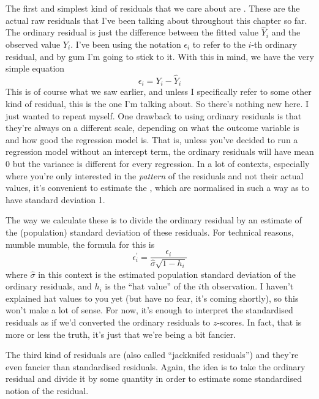The first and simplest kind of residuals that we care about are . These are the actual raw residuals that I've been talking about throughout this chapter so far. The ordinary residual is just the difference between the fitted value $\hat{Y}_i$ and the observed value $Y_i$. I've been using the notation $\epsilon_i$ to refer to the $i$-th ordinary residual, and by gum I'm going to stick to it. With this in mind, we have the very simple equation
$$
\epsilon_i = Y_i - \hat{Y}_i
$$
This is of course what we saw earlier, and unless I specifically refer to some other kind of residual, this is the one I'm talking about. So there's nothing new here. I just wanted to repeat myself. One drawback to using ordinary residuals is that they're always on a different scale, depending on what the outcome variable is and how good the regression model is. That is, unless you've decided to run a regression model without an intercept term, the ordinary residuals will have mean 0 but the variance is different for every regression. In a lot of contexts, especially where you're only interested in the {\it pattern} of the residuals and not their actual values, it's convenient to estimate the , which are normalised in such a way as to have standard deviation 1. 

\vspace{0.5cm}
\begin{mdframed}[style=MyFrame,nobreak=false]
The way we calculate these is to divide the ordinary residual by an estimate of the (population) standard deviation of these residuals. For technical reasons, mumble mumble, the formula for this is
$$
\epsilon_{i}^\prime = \frac{\epsilon_i}{\hat{\sigma} \sqrt{1-h_i}}
$$
where $\hat\sigma$ in this context is the estimated population standard deviation of the ordinary residuals, and $h_i$ is the ``hat value'' of the $i$th observation. I haven't explained hat values to you yet (but have no fear, it's coming shortly), so this won't make a lot of sense. For now, it's enough to interpret the standardised residuals as if we'd converted the ordinary residuals to $z$-scores. In fact, that is more or less the truth, it's just that we're being a bit fancier. 
\end{mdframed}

The third kind of residuals are  (also called ``jackknifed residuals'') and they're even fancier than standardised residuals. Again, the idea is to take the ordinary residual and divide it by some quantity in order to estimate some standardised notion of the residual. 

